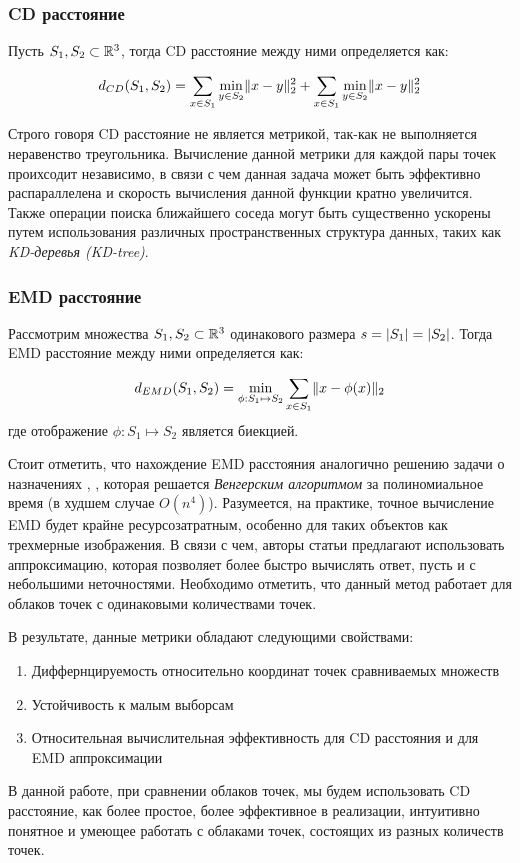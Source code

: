 \subsubsection{CD расстояние}

Пусть \(S_{1}, S_{2} \subset \mathbb{R}^3\), тогда CD расстояние между ними определяется как:

\[
	d_{CD}(S_{1}, S_{2}) = \sum\limits_{x \in S_{1}} \min\limits_{y \in S_{2}} \lVert x - y\rVert_{2}^{2} + \sum\limits_{x \in S_{1}} \min\limits_{y \in S_{2}} \lVert x - y\rVert_{2}^{2}
\]

\medskip
Строго говоря CD расстояние не является метрикой, так-как не выполняется неравенство треугольника. Вычисление данной метрики для каждой пары точек проихсодит независимо, в связи с чем данная задача может быть эффективно распараллелена и скорость вычисления данной функции кратно увеличится. Также операции поиска ближайшего соседа могут быть существенно ускорены путем использования различных пространственных структура данных, таких как \textit{KD-деревья (KD-tree)}. 

\subsubsection{EMD расстояние}

Рассмотрим множества \(S_{1}, S_{2} \subset \mathbb{R}^3\) одинакового размера \(s = \lvert S_{1}\rvert = \lvert S_{2}\rvert\). Тогда EMD расстояние между ними определяется как:

\[
	d_{EMD}(S_{1}, S_{2}) = \min\limits_{\phi:S_{1} \mapsto S_{2}} \sum\limits_{x \in S_{1}} \lVert x - \phi(x)\rVert_{2}
\] где отображение \(\phi:S_{1} \mapsto S_{2}\) является биекцией.


Стоит отметить, что нахождение EMD расстояния аналогично решению задачи о назначениях \cite{assignment-task-1}, \cite{assignment-task-2}, которая решается \textit{Венгерским алгоритмом}\cite{hungarian-alg} за полиномиальное время (в худшем случае $O(n^4)$). Разумеется, на практике, точное вычисление EMD будет крайне ресурсозатратным, особенно для таких объектов как трехмерные изображения. В связи с чем, авторы статьи \cite{metrics-source} предлагают использовать аппроксимацию, которая позволяет более быстро вычислять ответ, пусть и с небольшими неточностями. Необходимо отметить, что данный метод работает для облаков точек с одинаковыми количествами точек.

\bigskip
В результате, данные метрики обладают следующими свойствами:
\begin{enumerate}
\item Диффернцируемость относительно координат точек сравниваемых множеств
\item Устойчивость к малым выборсам
\item Относительная вычислительная эффективность для CD расстояния и для EMD аппроксимации
\end{enumerate}



В данной работе, при сравнении облаков точек, мы будем использовать CD расстояние, как более простое, более эффективное в реализации, интуитивно понятное и умеющее работать с облаками точек, состоящих из разных количеств точек.

